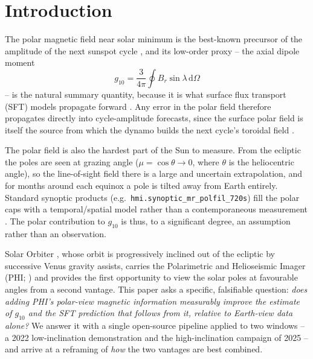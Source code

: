 \documentclass{aa}
\begin{document}


\maketitle

\section{Introduction}
\label{sec:introduction}

The polar magnetic field near solar minimum is the best-known precursor of the amplitude of the next sunspot cycle \citep{Svalgaard2005,Petrovay2020}, and its low-order proxy -- the axial dipole moment
\begin{equation}
    g_{10} = \frac{3}{4\pi} \oint B_r \sin\lambda \, \mathrm{d}\Omega
    \label{eq:g10-intro}
\end{equation}
-- is the natural summary quantity, because it is what surface flux transport (SFT) models propagate forward \citep{Babcock1961,Leighton1969,Sheeley2005,WangSheeley1991,Wang2017}. Any error in the polar field therefore propagates directly into cycle-amplitude forecasts, since the surface polar field is itself the source from which the dynamo builds the next cycle's toroidal field \citep{CameronSchussler2015}.

The polar field is also the hardest part of the Sun to measure. From the ecliptic the poles are seen at grazing angle ($\mu = \cos\theta \to 0$, where $\theta$ is the heliocentric angle), so the line-of-sight field there is a large and uncertain extrapolation, and for months around each equinox a pole is tilted away from Earth entirely. Standard synoptic products (e.g.\ \texttt{hmi.synoptic\_mr\_polfil\_720s}) fill the polar caps with a temporal/spatial model rather than a contemporaneous measurement \citep{Sun2018}. The polar contribution to $g_{10}$ is thus, to a significant degree, an assumption rather than an observation.

Solar Orbiter \citep{Muller2020}, whose orbit is progressively inclined out of the ecliptic by successive Venus gravity assists, carries the Polarimetric and Helioseismic Imager (PHI; \citealp{Solanki2020}) and provides the first opportunity to view the solar poles at favourable angles from a second vantage. This paper asks a specific, falsifiable question: \emph{does adding PHI's polar-view magnetic information measurably improve the estimate of $g_{10}$ and the SFT prediction that follows from it, relative to Earth-view data alone?} We answer it with a single open-source pipeline applied to two windows -- a 2022 low-inclination demonstration and the high-inclination campaign of 2025 -- and arrive at a reframing of \emph{how} the two vantages are best combined.
\end{document}
